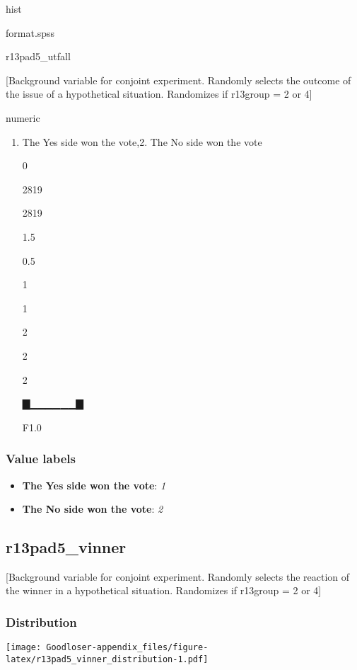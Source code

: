 \documentclass[]{book}
\providecommand{\tightlist}{%
  \setlength{\itemsep}{0pt}\setlength{\parskip}{0pt}}
\begin{document}
hist

format.spss

r13pad5\_utfall

{[}Background variable for conjoint experiment. Randomly selects the
outcome of the issue of a hypothetical situation. Randomizes if r13group
= 2 or 4{]}

numeric

\begin{enumerate}
\def\labelenumi{\arabic{enumi}.}
\tightlist
\item
  The Yes side won the vote,2. The No side won the vote

  0

  2819

  2819

  1.5

  0.5

  1

  1

  2

  2

  2

  ▇▁▁▁▁▁▁▇

  F1.0
\end{enumerate}

\subsubsection{Value labels}\label{r13pad5_utfall_labels}

\begin{itemize}
\tightlist
\item
  \textbf{The Yes side won the vote}: \emph{1}
\item
  \textbf{The No side won the vote}: \emph{2}
\end{itemize}

\subsection{r13pad5\_vinner}\label{r13pad5_vinner}

{[}Background variable for conjoint experiment. Randomly selects the
reaction of the winner in a hypothetical situation. Randomizes if
r13group = 2 or 4{]}

\subsubsection{Distribution}\label{r13pad5_vinner_distribution}

\texttt{[image: Goodloser-appendix\_files/figure-latex/r13pad5\_vinner\_distribution-1.pdf]}
\end{document}
